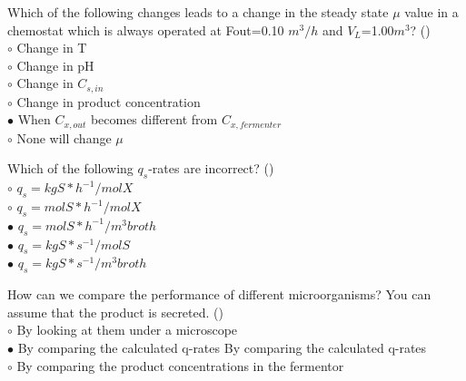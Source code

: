 \documentclass[]{beamer}
\begin{document}
\begin{frame}[shrink] {}
\addtocounter{answers}{1}
\color{blue}
Which of the following changes leads to a change in the steady state $\mu$ value in a chemostat which is always operated at Fout=0.10 $m^{3}/h$ and $V_L$=1.00$m^3$? ()\\
\color{black}
\setlength{\parindent}{-0.4cm}
{\color{red}$\circ$} Change in T\\
{\color{red}$\circ$} Change in pH\\
{\color{red}$\circ$} Change in $C_{s,in}$ \\
{\color{red}$\circ$} Change in product concentration\\
{\color{red}$\bullet$} When $C_{x,out}$ becomes different from $C_{x,fermenter}$ \\
{\color{red}$\circ$} None will change $\mu$\\
\end{frame}

\begin{frame}[shrink] {}
\addtocounter{answers}{1}
\color{blue}
Which of the following $q_s$-rates are incorrect? ()\\
\color{black}
\setlength{\parindent}{-0.4cm}
{\color{red}$\circ$} $q_s = kgS*h^{-1}/molX$ \\ 
{\color{red}$\circ$} $q_s = molS*h^{-1}/molX$ \\ 
{\color{red}$\bullet$} $q_s = molS*h^{-1}/m^{3}broth$ \\ 
{\color{red}$\bullet$} $q_s = kgS*s^{-1}/molS$ \\ 
{\color{red}$\bullet$} $q_s = kgS*s^{-1}/m^{3}broth$ \\ 
\end{frame}

\begin{frame}[shrink] {}
\addtocounter{answers}{1}
\color{blue}
How can we compare the performance of different microorganisms? You can assume that the product is secreted. ()\\
\color{black}
\setlength{\parindent}{-0.4cm}
{\color{red}$\circ$}  By looking at them under a microscope\\
{\color{red}$\bullet$} By comparing the calculated q-rates By comparing the calculated q-rates \\
{\color{red}$\circ$} By comparing the product concentrations in the fermentor \\
\end{frame}
\end{document}

